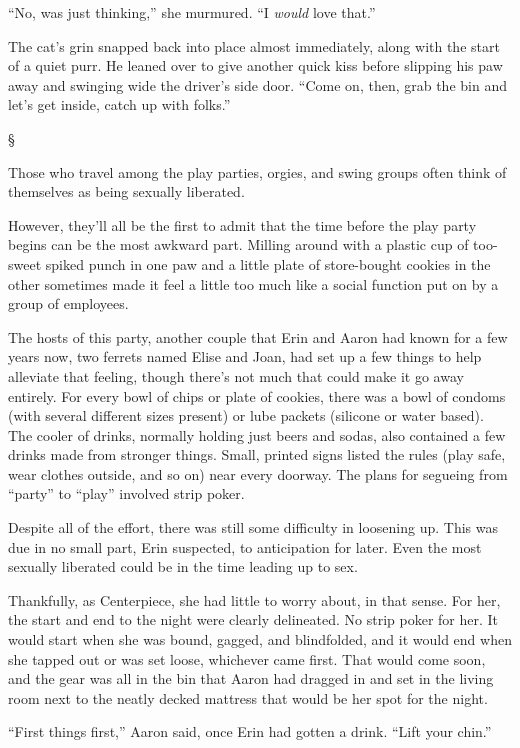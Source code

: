 \documentclass[12pt,letterpaper,oneside]{memoir}
\newcommand\secdiv{
  \begin{center}
    \S
  \end{center}
}
\begin{document}
  ``No, was just thinking,'' she murmured. ``I \textit{would} love that.''

  The cat's grin snapped back into place almost immediately, along with the start of a quiet purr. He leaned over to give another quick kiss before slipping his paw away and swinging wide the driver's side door. ``Come on, then, grab the bin and let's get inside, catch up with folks.''

  \secdiv

  Those who travel among the play parties, orgies, and swing groups often think of themselves as being sexually liberated.

  However, they'll all be the first to admit that the time before the play party begins can be the most awkward part. Milling around with a plastic cup of too-sweet spiked punch in one paw and a little plate of store-bought cookies in the other sometimes made it feel a little too much like a social function put on by a group of employees.

  The hosts of this party, another couple that Erin and Aaron had known for a few years now, two ferrets named Elise and Joan, had set up a few things to help alleviate that feeling, though there's not much that could make it go away entirely. For every bowl of chips or plate of cookies, there was a bowl of condoms (with several different sizes present) or lube packets (silicone or water based). The cooler of drinks, normally holding just beers and sodas, also contained a few drinks made from stronger things. Small, printed signs listed the rules (play safe, wear clothes outside, and so on) near every doorway. The plans for segueing from ``party'' to ``play'' involved strip poker.

  Despite all of the effort, there was still some difficulty in loosening up. This was due in no small part, Erin suspected, to anticipation for later. Even the most sexually liberated could be in the time leading up to sex.

  Thankfully, as Centerpiece, she had little to worry about, in that sense. For her, the start and end to the night were clearly delineated. No strip poker for her. It would start when she was bound, gagged, and blindfolded, and it would end when she tapped out or was set loose, whichever came first. That would come soon, and the gear was all in the bin that Aaron had dragged in and set in the living room next to the neatly decked mattress that would be her spot for the night.

  ``First things first,'' Aaron said, once Erin had gotten a drink. ``Lift your chin.''
\end{document}
